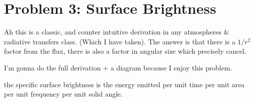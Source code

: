 \section*{Problem 3: Surface Brightness}

Ah this is a classic, and counter intuitive derivation in any atmospheres \& radiative transfers class.  (Which I have taken). The answer is that there is a $1/r^2$ factor from the flux, there is also a factor in angular size  which precisely cancel. 

I'm gonna do the full derivation + a diagram because I enjoy this problem. 

the specific surface brightness is the energy emitted per unit time per unit area per unit frequency per unit solid angle. 



